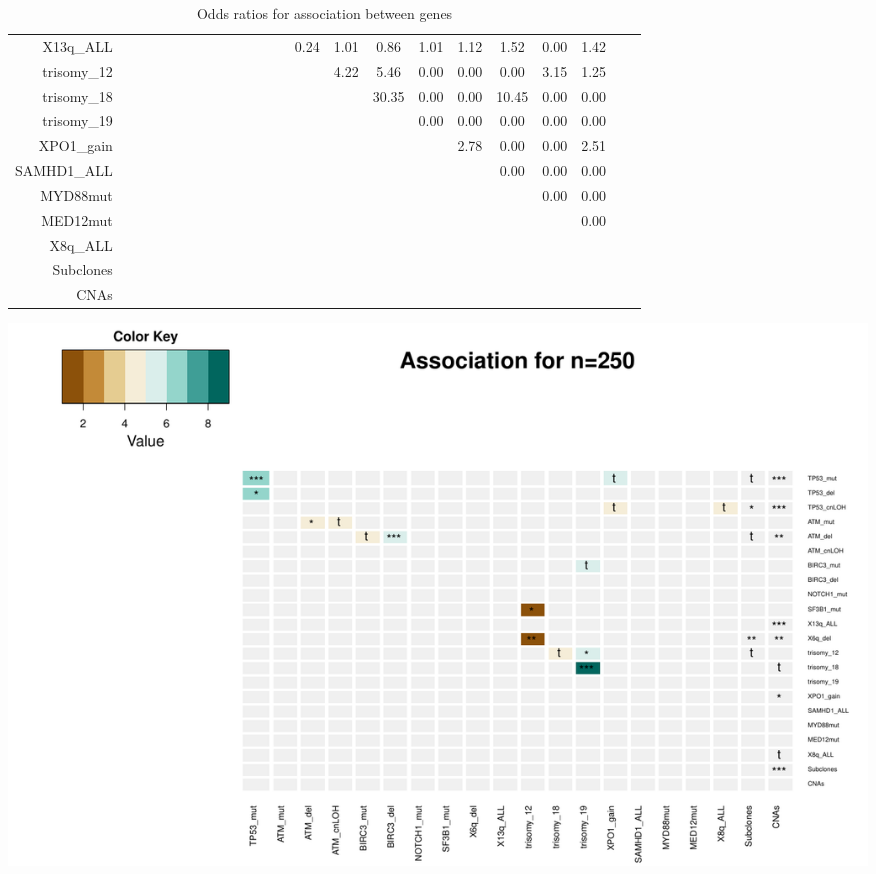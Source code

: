\documentclass[a4paper,11pt]{article}
\begin{document}
\begin{landscape}
\begin{table}[ht]
{{\begin{tabular}{|r|c|c|c|c|c|c|c|c|c|c|c|c|c|c|c|c|c|c|c|c|c|c|}
  X13q\_ALL &  &  &  &  &  &  &  &  &  &  &  &  & 0.24 & 1.01 & 0.86 & 1.01 & 1.12 & 1.52 & 0.00 & 1.42 &  &  \\ 
  trisomy\_12 &  &  &  &  &  &  &  &  &  &  &  &  &  & 4.22 & 5.46 & 0.00 & 0.00 & 0.00 & 3.15 & 1.25 &  &  \\ 
  trisomy\_18 &  &  &  &  &  &  &  &  &  &  &  &  &  &  & 30.35 & 0.00 & 0.00 & 10.45 & 0.00 & 0.00 &  &  \\ 
  trisomy\_19 &  &  &  &  &  &  &  &  &  &  &  &  &  &  &  & 0.00 & 0.00 & 0.00 & 0.00 & 0.00 &  &  \\ 
  XPO1\_gain &  &  &  &  &  &  &  &  &  &  &  &  &  &  &  &  & 2.78 & 0.00 & 0.00 & 2.51 &  &  \\ 
  SAMHD1\_ALL &  &  &  &  &  &  &  &  &  &  &  &  &  &  &  &  &  & 0.00 & 0.00 & 0.00 &  &  \\ 
  MYD88mut &  &  &  &  &  &  &  &  &  &  &  &  &  &  &  &  &  &  & 0.00 & 0.00 &  &  \\ 
  MED12mut &  &  &  &  &  &  &  &  &  &  &  &  &  &  &  &  &  &  &  & 0.00 &  &  \\ 
  X8q\_ALL &  &  &  &  &  &  &  &  &  &  &  &  &  &  &  &  &  &  &  &  &  &  \\ 
  Subclones &  &  &  &  &  &  &  &  &  &  &  &  &  &  &  &  &  &  &  &  &  &  \\ 
  CNAs &  &  &  &  &  &  &  &  &  &  &  &  &  &  &  &  &  &  &  &  &  &  \\ 
   \hline
\end{tabular}
}
}
\caption{Odds ratios for association between genes} 
\end{table}\end{landscape}
\newpage

\includegraphics{HICF1_Finalreportv6-010}
\end{document}
